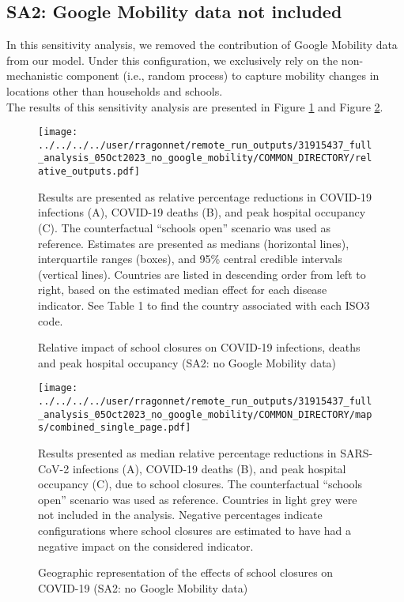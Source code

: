 \subsection{SA2: Google Mobility data not included}

In this sensitivity analysis, we removed the contribution of Google Mobility data from our model.  
Under this configuration, we exclusively rely on the non-mechanistic component (i.e., random process) to capture 
mobility changes in locations other than households and schools.
\\

The results of this sensitivity analysis are presented in Figure \ref{fig:SA2_rel_outputs} and Figure \ref{fig:SA2_maps}.

\begin{figure}[!ht]
    \begin{center}
    \texttt{[image: ../../../../user/rragonnet/remote\_run\_outputs/31915437\_full\_analysis\_05Oct2023\_no\_google\_mobility/COMMON\_DIRECTORY/relative\_outputs.pdf]}
    \end{center}
    \caption{Relative impact of school closures on COVID-19 infections, deaths and peak hospital occupancy (SA2: no Google Mobility data)} 
    Results are presented as relative percentage reductions in COVID-19 infections (A), 
    COVID-19 deaths (B), and peak hospital occupancy (C). The counterfactual ``schools open'' scenario was used as reference. 
    Estimates are presented as medians (horizontal lines), interquartile ranges (boxes), and 95\% central credible intervals (vertical lines). 
    Countries are listed in descending order from left to right, based on the estimated median effect for each disease indicator. See Table 1 to find the country associated with each ISO3 code. 
    \label{fig:SA2_rel_outputs}
\end{figure}

\begin{figure}[!ht]
    \begin{center}
    \texttt{[image: ../../../../user/rragonnet/remote\_run\_outputs/31915437\_full\_analysis\_05Oct2023\_no\_google\_mobility/COMMON\_DIRECTORY/maps/combined\_single\_page.pdf]}
    \end{center}
    \caption{Geographic representation of the effects of school closures on COVID-19 (SA2: no Google Mobility data)} 
    Results presented as median relative percentage reductions in SARS-CoV-2 infections (A), COVID-19 deaths (B), and peak hospital occupancy (C), due to school closures. The counterfactual “schools open” scenario was used as reference. Countries in light grey were not included in the analysis. Negative percentages indicate configurations where school closures are estimated to have had a negative impact on the considered indicator.
    \label{fig:SA2_maps}
\end{figure}




